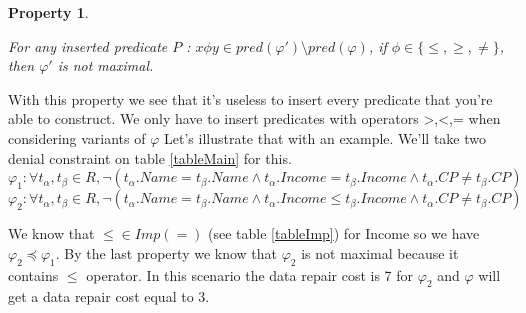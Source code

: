 \documentclass[letterpaper, 12pt]{report}
\newtheorem{myprop}{Property}
\begin{document}
\begin{myprop}\cite{main}

For any inserted predicate $ P $ : $x \phi y \in pred(\varphi ') \setminus pred(\varphi)$, if $\phi \in \{\leq,\geq,\neq \}$, then $\varphi '$ is not maximal.

\end{myprop}

With this property we see that it's useless to insert every predicate that you're able to construct. We only have to insert predicates with operators {>,<,=} when considering variants of $\varphi$ Let's illustrate that with an example. We'll take two denial constraint on table \ref{tableMain} for this.
$$\varphi_1 : \forall t_\alpha,t_\beta \in R, \neg( t_\alpha.Name = t_\beta.Name \wedge t_\alpha.Income = t_\beta.Income \wedge t_\alpha.CP \neq t_\beta.CP )$$
$$\varphi_2 : \forall t_\alpha,t_\beta \in R, \neg( t_\alpha.Name = t_\beta.Name \wedge t_\alpha.Income \leq t_\beta.Income \wedge t_\alpha.CP \neq t_\beta.CP )$$


We know that $\leq \in Imp(=)$ (see table \ref{tableImp}) for Income so we have $\varphi_2 \preceq \varphi_1$. By the last property we know that $\varphi_2$ is not maximal because it contains $\leq$ operator. In this scenario the data repair cost is 7 for $\varphi_2$ and $\varphi$ will get a data repair cost equal to 3. 
\end{document}
